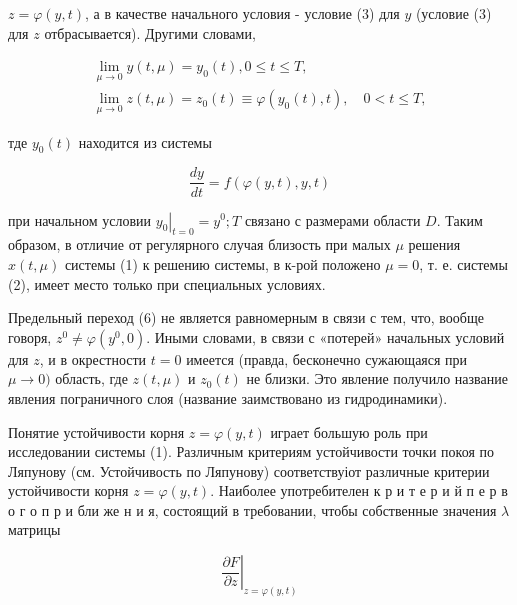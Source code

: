 \documentclass[10pt]{article}
\begin{document}
$z=\varphi(y, t)$, а в качестве начального условия - условие (3) для $y$ (условие (3) для $z$ отбрасывается). Другими словами,



\[

\begin{gathered}

\lim _{\mu \rightarrow 0} y(t, \mu)=y_{0}(t), 0 \leqslant t \leqslant T, \\

\lim _{\mu \rightarrow 0} z(t, \mu)=z_{0}(t) \equiv \varphi\left(y_{0}(t), t\right), \quad 0<t \leqslant T,

\end{gathered}

\]



тде $y_{0}(t)$ находится из системы



\[

\frac{d y}{d t}=f(\varphi(y, t), y, t)

\]



при начальном условии $\left.y_{0}\right|_{t=0}=y^{0} ; T$ связано с размерами области $D$. Таким образом, в отличие от регулярного случая близость при малых $\mu$ решения $x(t, \mu)$ системы (1) к решению системы, в к-рой положено $\mu=0$, т. е. системы (2), имеет место только при специальных условиях.



Предельный переход (6) не является равномерным в связи с тем, что, вообще говоря, $z^{0} \neq \varphi\left(y^{0}, 0\right)$. Иными словами, в связи с «потерей» начальных условий для $z$, и в окрестности $t=0$ имеется (правда, бесконечно сужающаяся при $\mu \rightarrow 0)$ область, где $z(t, \mu)$ и $z_{0}(t)$ не близки. Это явление получило название явления пограничного слоя (название заимствовано из гидродинамики).



Понятие устойчивости корня $z=\varphi(y, t)$ играет большую роль при исследовании системы (1). Различным критериям устойчивости точки покоя по Ляпунову (см. Устойчивость по Ляпунову) соответствуіот различные критерии устойчивости корня $z=\varphi(y, t)$. Наиболее употребителен к р и т е р и й п е р в о г о п р и бли же н и я, состоящий в требовании, чтобы собственные значения $\lambda$ матрицы



\[

\left.\frac{\partial F}{\partial z}\right|_{z=\varphi(y, t)}

\]
\end{document}
